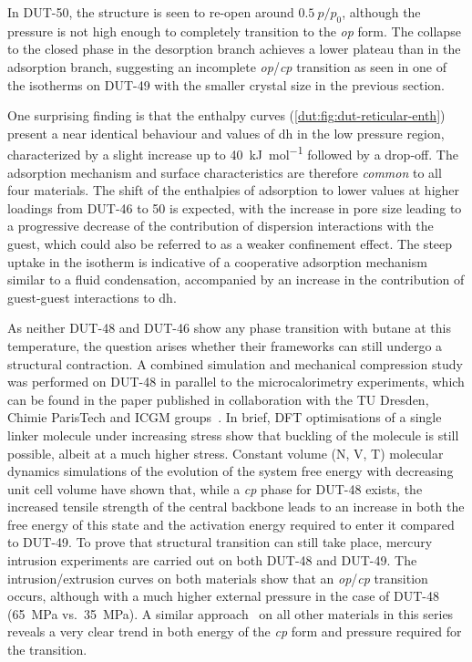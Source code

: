 In DUT-50, the structure is seen to re-open around \(0.5~p/p_0\), although 
the pressure is not high enough to completely transition to the
\textit{op} form. The collapse to the closed phase in the desorption
branch achieves a lower plateau than in the adsorption branch,
suggesting an incomplete \textit{op}/\textit{cp} transition as seen in one 
of the isotherms on DUT-49 with the smaller crystal size in the previous
section.

One surprising finding is that the enthalpy curves 
(\autoref{dut:fig:dut-reticular-enth}) present a near
identical behaviour and values of \gls{dh} in the 
low pressure region, characterized by a slight increase up to 
\SI{40}{\kilo\joule\per\mol} followed by a drop-off. The adsorption
mechanism and surface characteristics are therefore \textit{common} to 
all four materials. The shift of the enthalpies of adsorption to lower 
values at higher loadings from DUT-46 to 50 is expected, with the increase
in pore size leading to a progressive decrease of the contribution 
of dispersion interactions with the guest, which could also be 
referred to as a weaker confinement effect. The steep uptake in the isotherm
is indicative of a cooperative adsorption mechanism similar to a fluid
condensation, accompanied by an increase in the contribution of 
guest-guest interactions to \gls{dh}.

As neither DUT-48 and DUT-46 show any phase transition with
butane at this temperature, the question arises whether their frameworks
can still undergo a structural contraction. A combined simulation and 
mechanical compression study was performed on DUT-48 in parallel to the 
microcalorimetry experiments, which can be found in the paper 
published in collaboration with the TU Dresden, Chimie ParisTech and 
ICGM groups~\cite{krauseAdsorptionContractionMechanics2018}.
In brief, \gls{DFT} optimisations of a single linker molecule under increasing
stress show that buckling of the molecule is still possible, albeit
at a much higher stress. Constant volume (N, V, T) molecular dynamics
simulations of the evolution of the system free energy with decreasing
unit cell volume have shown that, while a \textit{cp} phase for DUT-48
exists, the increased tensile strength of the central backbone leads
to an increase in both the free energy of this state and the activation
energy required to enter it compared to DUT-49. To prove that structural
transition can still take place, mercury intrusion experiments are 
carried out on both DUT-48 and DUT-49. The intrusion/extrusion 
curves on both materials show that an \textit{op}/\textit{cp} transition occurs,
although with a much higher external pressure in the case 
of DUT-48 (\SI{65}{\mega\pascal} vs.\ \SI{35}{\mega\pascal}). A similar
approach~\cite{krauseImpactPoreSize2018} on all other materials in this series 
reveals a very clear trend in both energy of the \textit{cp} form and
pressure required for the transition.

